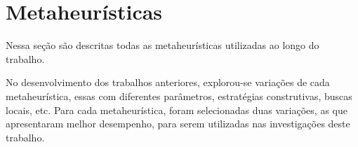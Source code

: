\section{Metaheurísticas}
\label{section:metaheuristics}

Nessa seção são descritas todas as metaheurísticas utilizadas ao longo do trabalho.

No desenvolvimento dos trabalhos anteriores, explorou-se variações de cada metaheurística, essas com diferentes parâmetros, estratégias construtivas, buscas locais, etc. Para cada metaheurística, foram selecionadas duas variações, as que apresentaram melhor desempenho, para serem utilizadas nas investigações deste trabalho.
